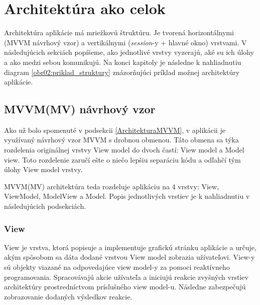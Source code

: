 \chapter{Architektúra ako celok}

Architektúra aplikácie má mriežkovú štruktúru. Je tvorená horizontálnymi (MVVM návrhový vzor) a vertikálnymi (\textit{session}-y + hlavné okno) vrstvami. V následujúcich sekciách popíšeme, ako jednotlivé vrstvy vyzerajú, aké su ich úlohy a ako medzi sebou komunikujú. Na konci kapitoly je následne k nahliadnutiu diagram \ref{obr02:priklad_struktury} znázorňujúci príklad možnej architektúry aplikácie.   

\section{MVVM(MV) návrhový vzor}\label{MVVMNavrhovyVzor}

Ako už bolo spomenuté v podsekcii \ref{ArchitekturaMVVM}, v aplikácii je využívaný návrhový vzor MVVM s drobnou obmenou. Táto obmena sa týka rozdelenia originálnej vrstvy View model do dvoch častí: View model a Model view. Toto rozdelenie zaručí ešte o niečo lepšiu separáciu kódu a odľahčí tým úlohy View model vrstvy. 

MVVM(MV) architektúra teda rozdeluje aplikáciu na 4 vrstvy: View, ViewModel, ModelView a Model. Popis jednotlivých vrstiev je k nahliadnutiu v následujúcich podsekciách. 

\subsection{View}

View je vrstva, ktorá popisuje a implementuje grafickú stránku aplikácie a určuje, akým spôsobom sa dáta dodané vrstvou View model zobrazia užívateľovi. View-y sú objekty viazané na odpovedajúce view model-y za pomoci reaktívneho programovania. Spracovávajú akcie užívateľa a iniciujú reakcie zvyšných vrstiev architektúry prostredníctvom príslušného view model-u. Následne zabezpečujú zobrazovanie dodaných výsledkov reakcie.

